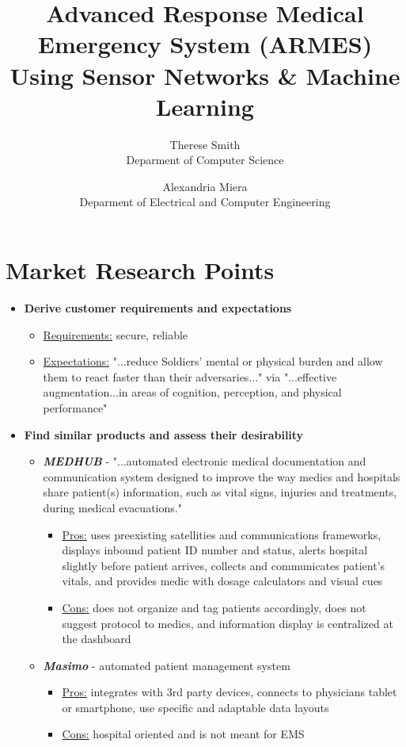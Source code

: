 \documentclass[man]{article}
\title{Advanced Response Medical Emergency System (ARMES) Using Sensor Networks \& Machine Learning}
\author{Therese Smith \\ Deparment of Computer Science \and Alexandria Miera \\ Deparment of Electrical and Computer Engineering}
\begin{document}
  \maketitle
  \newpage



  \section{Market Research Points}
    \begin{itemize}
      \item \textbf{Derive customer requirements and expectations}
      \begin{itemize}
        \item \underline{Requirements:} secure, reliable
        \item \underline{Expectations:} "...reduce Soldiers’ mental or physical
        burden and allow them to react faster than their adversaries..." via "...effective augmentation...in areas of cognition, perception, and physical performance" \cite{usarmygrant}
      \end{itemize}

      \item \textbf{Find similar products and assess their desirability}
      \begin{itemize}
        \item \textbf{\emph{MEDHUB}} - "...automated electronic medical documentation and communication system designed to improve the way medics and hospitals share patient(s) information, such as vital signs, injuries and treatments, during medical evacuations." \cite{medhub}
        \begin{itemize}
          \item \underline{Pros:} uses preexisting satellities and communications frameworks, displays inbound patient ID number and status, alerts hospital slightly before patient arrives, collects and communicates patient's vitals, and provides medic with dosage calculators and visual cues
          \item \underline{Cons:} does not organize and tag patients accordingly, does not suggest protocol to medics, and information display is centralized at the dashboard
        \end{itemize}
        \newpage

        \item \textbf{\emph{Masimo}} - automated patient management system \cite{masimo}
        \begin{itemize}
          \item \underline{Pros:} integrates with 3rd party devices, connects to physicians tablet or smartphone, use specific and adaptable data layouts
          \item \underline{Cons:} hospital oriented and is not meant for EMS
        \end{itemize}


\end{itemize}
\end{itemize}
\end{document}
